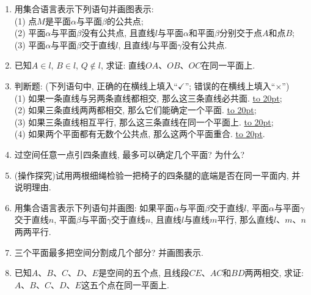 \documentclass[10pt,a4paper]{article}
\newcommand{\blank}[1]{\underline{\hbox to #1pt{}}}
\begin{document}
\begin{enumerate}[1.]

\item 用集合语言表示下列语句并画图表示:\\
(1) 点$M$是平面$\alpha$与平面$\beta$的公共点;\\
(2) 平面$\alpha$与平面$\beta$没有公共点, 且直线$l$与平面$\alpha$和平面$\beta$分别交于点$A$和点$B$;\\
(3) 平面$\alpha$与平面$\beta$交于直线$l$, 且直线$l$与平面$\gamma$没有公共点.
\item 已知$A\in l$, $B\in l$, $Q\notin l$, 求证: 直线$OA$、$OB$、$OC$在同一平面上.
\begin{center}
\end{center}
\item 判断题: (下列语句中, 正确的在横线上填入``$\checkmark$''; 错误的在横线上填入``$\times$'')\\
(1) 如果一条直线与另两条直线都相交, 那么这三条直线必共面. \blank{20};\\
(2) 如果三条直线两两都相交, 那么它们能确定一个平面. \blank{20};\\
(3) 如果三条直线相互平行, 那么这三条直线在同一个平面上. \blank{20};\\
(4) 如果两个平面都有无数个公共点, 那么这两个平面重合.   \blank{20}.
\item 过空间任意一点引四条直线, 最多可以确定几个平面? 为什么?
\item (操作探究)试用两根细绳检验一把椅子的四条腿的底端是否在同一平面内, 并说明理由.
\item 用集合语言表示下列语句并画图:
如果平面$\alpha$与平面$\beta$交于直线$l$, 平面$\alpha$与平面$\gamma$交于直线$n$, 平面$\beta$与平面$\gamma$交于直线$n$, 且直线$l$与直线$m$平行, 那么直线$l$、$m$、$n$两两平行.
\item 三个平面最多把空间分割成几个部分? 并画图表示.
\item 已知$A$、$B$、$C$、$D$、$E$是空间的五个点, 且线段$CE$、$AC$和$BD$两两相交, 求证: $A$、$B$、$C$、$D$、$E$这五个点在同一平面上.

\end{enumerate}
\end{document}
